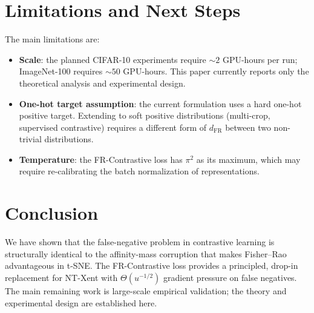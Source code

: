 \documentclass[11pt]{article}
\begin{document}
\section{Limitations and Next Steps}

The main limitations are:
\begin{itemize}
  \item \textbf{Scale}: the planned CIFAR-10 experiments require $\sim 2$ GPU-hours per
        run; ImageNet-100 requires $\sim 50$ GPU-hours. This paper currently reports only
        the theoretical analysis and experimental design.
  \item \textbf{One-hot target assumption}: the current formulation uses a hard one-hot
        positive target. Extending to soft positive distributions (multi-crop, supervised
        contrastive) requires a different form of $d_{\mathrm{FR}}$ between two non-trivial
        distributions.
  \item \textbf{Temperature}: the FR-Contrastive loss has $\pi^2$ as its maximum, which
        may require re-calibrating the batch normalization of representations.
\end{itemize}

\section{Conclusion}

We have shown that the false-negative problem in contrastive learning is structurally
identical to the affinity-mass corruption that makes Fisher--Rao advantageous in t-SNE.
The FR-Contrastive loss provides a principled, drop-in replacement for NT-Xent with
$\Theta(u^{-1/2})$ gradient pressure on false negatives. The main remaining work is
large-scale empirical validation; the theory and experimental design are established here.



\end{document}
